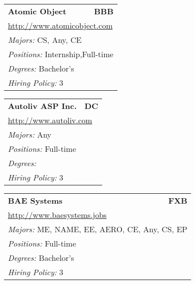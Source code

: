 \documentclass[twoside]{article}
\begin{document}
\begin{center}
\begin{multicols}{3}
\begin{FlushLeft}
\begin{minipage}{.9\columnwidth}
\end{minipage}
 
\begin{minipage}{.9\columnwidth}\begin{tabularx}{.95\columnwidth}{Xr}
                 {\Large\bf Atomic Object} & {\Large\bf BBB}\\
    \multicolumn{2}{p{.95\columnwidth}}{\url{http://www.atomicobject.com}}\\
    \multicolumn{2}{p{.95\columnwidth}}{\emph{Majors:} CS, Any, CE}\\
    \multicolumn{2}{p{.95\columnwidth}}{\emph{Positions:} Internship,Full-time}\\
    \multicolumn{2}{p{.95\columnwidth}}{\emph{Degrees:} Bachelor's}\\
    \multicolumn{2}{p{.95\columnwidth}}{\emph{Hiring Policy:} 3}\\
    \end{tabularx}
    
\end{minipage}
 
\begin{minipage}{.9\columnwidth}\begin{tabularx}{.95\columnwidth}{Xr}
                 {\Large\bf Autoliv ASP Inc.} & {\Large\bf DC}\\
    \multicolumn{2}{p{.95\columnwidth}}{\url{http://www.autoliv.com}}\\
    \multicolumn{2}{p{.95\columnwidth}}{\emph{Majors:} Any}\\
    \multicolumn{2}{p{.95\columnwidth}}{\emph{Positions:} Full-time}\\
    \multicolumn{2}{p{.95\columnwidth}}{\emph{Degrees:} }\\
    \multicolumn{2}{p{.95\columnwidth}}{\emph{Hiring Policy:} 3}\\
    \end{tabularx}
    
\end{minipage}
 
\begin{minipage}{.9\columnwidth}\begin{tabularx}{.95\columnwidth}{Xr}
                 {\Large\bf BAE Systems} & {\Large\bf FXB}\\
    \multicolumn{2}{p{.95\columnwidth}}{\url{http://www.baesystems.jobs}}\\
    \multicolumn{2}{p{.95\columnwidth}}{\emph{Majors:} ME, NAME, EE, AERO, CE, Any, CS, EP}\\
    \multicolumn{2}{p{.95\columnwidth}}{\emph{Positions:} Full-time}\\
    \multicolumn{2}{p{.95\columnwidth}}{\emph{Degrees:} Bachelor's}\\
    \multicolumn{2}{p{.95\columnwidth}}{\emph{Hiring Policy:} 3}\\
    \end{tabularx}
    

\end{minipage}
\end{FlushLeft}
\end{multicols}
\end{center}
\end{document}
